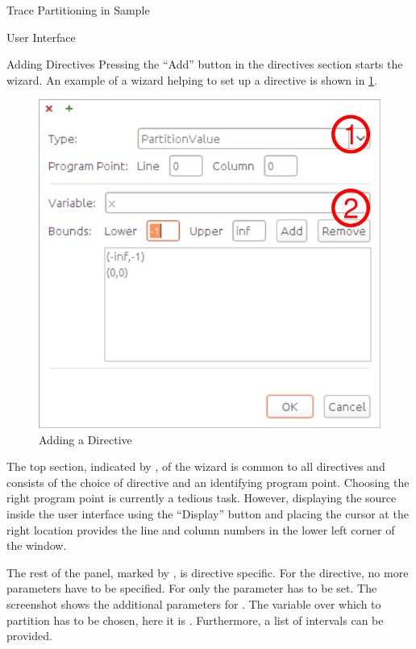 \begin{chapter}{Trace Partitioning in Sample}
\begin{section}{User Interface}

		\begin{subsection}{Adding Directives}
			Pressing the ``Add'' button in the directives section starts the wizard. An example of a wizard helping to set up a  directive is shown in \ref{figure:AddDirective}. 

			\begin{figure}
				\centering
				\includegraphics[scale=0.7]{Images/AddDirective.pdf}
				\caption{Adding a Directive}
				\label{figure:AddDirective}
			\end{figure}

			The top section, indicated by \one, of the wizard is common to all directives and consists of the choice of directive and an identifying program point. Choosing the right program point is currently a tedious task. However, displaying the source inside the user interface using the ``Display'' button and placing the cursor at the right location provides the line and column numbers in the lower left corner of the window.

			The rest of the panel, marked by \two, is directive specific. For the  directive, no more parameters have to be specified. For  only the parameter  has to be set. The screenshot shows the additional parameters for . The variable over which to partition has to be chosen, here it is . Furthermore, a list of intervals can be provided.
		\end{subsection}


\end{section}
\end{chapter}
